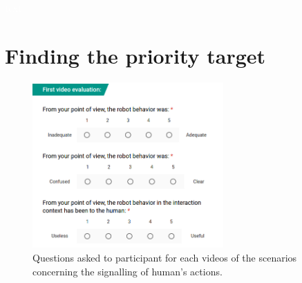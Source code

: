\textcolor{white}{text}
\vspace{-30pt}

\section{Finding the priority target}

\begin{figure}[!h]
	\centering
    \includegraphics[width=0.65\textwidth]{figs/Chapter6/QuestionsSce6.png}
    \caption{Questions asked to participant for each videos of the scenarios concerning the signalling of human's actions.}
    \label{fig:QuestionsSce6}
\end{figure}
